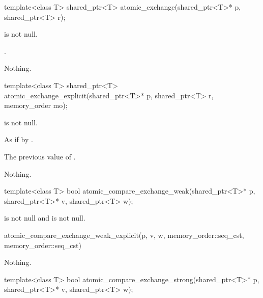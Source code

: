%
\begin{itemdecl}
template<class T> shared_ptr<T> atomic_exchange(shared_ptr<T>* p, shared_ptr<T> r);
\end{itemdecl}

\begin{itemdescr}
\pnum
\expects
{} is not null.

\pnum
\returns
{}.

\pnum
\throws
Nothing.
\end{itemdescr}

%
\begin{itemdecl}
template<class T>
  shared_ptr<T> atomic_exchange_explicit(shared_ptr<T>* p, shared_ptr<T> r, memory_order mo);
\end{itemdecl}

\begin{itemdescr}
\pnum
\expects
{} is not null.

\pnum
\effects
As if by .

\pnum
\returns
The previous value of .

\pnum
\throws
Nothing.
\end{itemdescr}

%
\begin{itemdecl}
template<class T>
  bool atomic_compare_exchange_weak(shared_ptr<T>* p, shared_ptr<T>* v, shared_ptr<T> w);
\end{itemdecl}

\begin{itemdescr}
\pnum
\expects
{} is not null and  is not null.

\pnum
\returns
\begin{codeblock}
atomic_compare_exchange_weak_explicit(p, v, w, memory_order::seq_cst, memory_order::seq_cst)
\end{codeblock}

\pnum
\throws
Nothing.
\end{itemdescr}

%
\begin{itemdecl}
template<class T>
  bool atomic_compare_exchange_strong(shared_ptr<T>* p, shared_ptr<T>* v, shared_ptr<T> w);
\end{itemdecl}

